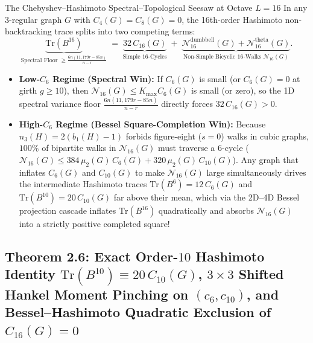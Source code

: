 \documentclass[10pt,a4paper]{article}
\theoremstyle{definition}
\theoremstyle{remark}
\begin{document}
\begin{seesawbox}{The Chebyshev--Hashimoto Spectral--Topological Seesaw at Octave $L = 16$}
In any 3-regular graph $G$ with $C_4(G) = C_8(G) = 0$, the 16th-order Hashimoto non-backtracking trace splits into two competing terms:
\[
  \underbrace{\mathrm{Tr}(B^{16})}_{\text{Spectral Floor } \ge \frac{6n(11{,}179r - 85n)}{n-r}} \;=\; \underbrace{32\,C_{16}(G)}_{\text{Simple } 16\text{-Cycles}} \;+\; \underbrace{\mathcal{N}_{16}^{\mathrm{dumbbell}}(G) + \mathcal{N}_{16}^{\mathrm{theta}}(G)}_{\text{Non-Simple Bicyclic } 16\text{-Walks } \mathcal{N}_{16}(G)}.
\]
\begin{itemize}[nosep,leftmargin=1.5em]
  \item \textbf{Low-$C_6$ Regime (Spectral Win):} If $C_6(G)$ is small (or $C_6(G) = 0$ at girth $g \ge 10$), then $\mathcal{N}_{16}(G) \le K_{\max} C_6(G)$ is small (or zero), so the 1D spectral variance floor $\frac{6n(11{,}179r - 85n)}{n-r}$ directly forces $32\,C_{16}(G) > 0$.
  \item \textbf{High-$C_6$ Regime (Bessel Square-Completion Win):} Because $n_3(H) = 2(b_1(H)-1)$ forbids figure-eight ($s=0$) walks in cubic graphs, $100\%$ of bipartite walks in $\mathcal{N}_{16}(G)$ must traverse a $6$-cycle ($\mathcal{N}_{16}(G) \le 384\,\mu_2(G)\,C_6(G) + 320\,\mu_2(G)\,C_{10}(G)$). Any graph that inflates $C_6(G)$ and $C_{10}(G)$ to make $\mathcal{N}_{16}(G)$ large simultaneously drives the intermediate Hashimoto traces $\mathrm{Tr}(B^6) = 12\,C_6(G)$ and $\mathrm{Tr}(B^{10}) = 20\,C_{10}(G)$ far above their mean, which via the 2D--4D Bessel projection cascade inflates $\mathrm{Tr}(B^{16})$ quadratically and absorbs $\mathcal{N}_{16}(G)$ into a strictly positive completed square!
\end{itemize}
\end{seesawbox}

\subsection{Theorem 2.6: Exact Order-$10$ Hashimoto Identity $\mathrm{Tr}(B^{10}) \equiv 20\,C_{10}(G)$, $3 \times 3$ Shifted Hankel Moment Pinching on $(c_6, c_{10})$, and Bessel--Hashimoto Quadratic Exclusion of $C_{16}(G) = 0$}
\end{document}
